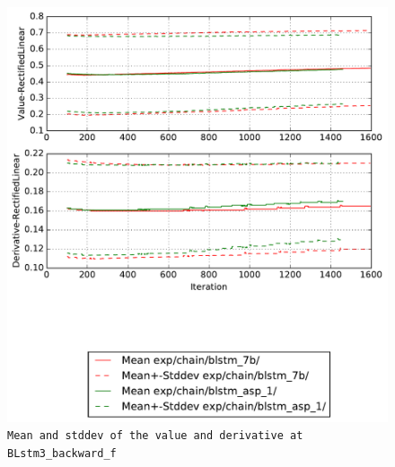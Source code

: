 \documentclass[prl,10pt,twocolumn]{revtex4}
\begin{document}
\newpage
\begin{figure}[h]
  \begin{center}
    \caption{\texttt{Mean and stddev of the value and derivative at BLstm3\_backward\_f}}
    \includegraphics[width=\textwidth]{exp/chain/blstm_7b/report/nonlinstats_BLstm3_backward_f.pdf}
  \end{center}
\end{figure}
\clearpage
\end{document}

